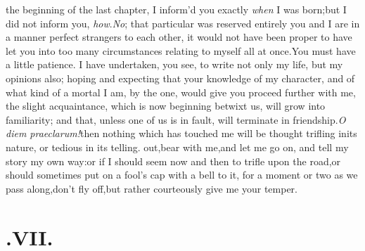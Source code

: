 \documentclass{article}
\begin{document}
 the beginning of the last chapter,
I inform’d you exactly \textit{when} I was born;\tsk but I did not inform
you, \textit{how}.\break\textit{No}; that particular was reserved entirely 
you and I are in a manner
perfect stran\-gers to each other, it would not have been proper to
have let you into too many circumstances relating to myself all at
once.\tsk You must have a little patience. I have undertaken, you see, to write not only my life,
but my opinions also; ho\-ping and expecting that your knowledge
of my character, and of what kind of a
mortal I am, by the one, would give you
proceed further with me, the slight ac\-quaintance, which is now beginning betwixt us,
will grow into familiarity; and that, unless one of us is in fault, will\break
terminate in friendship.\tsk \textit{O diem
prae\-clarum!}\tsh then nothing which has touched me will be
thought trifling in\break its nature, or tedious in its telling.\break
{}
out,\tsk bear with me,\tsk and let me go on, and tell my story my own
way:\tsh or if I should seem now and then to trifle upon the
road,\tsk or should sometimes put on a fool’s cap with a
bell to it, for a moment or two as we pass along,\tsk don’t
fly off,\tsk but rather courteously give me
your temper.

\null
\section{.\enspace VII.}
\end{document}
